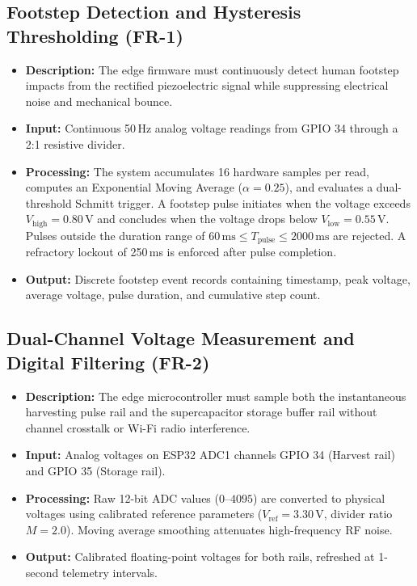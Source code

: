 \subsection{Footstep Detection and Hysteresis Thresholding (FR-1)}
\begin{itemize}
    \item \textbf{Description:} The edge firmware must continuously detect human footstep impacts from the rectified piezoelectric signal while suppressing electrical noise and mechanical bounce.
    \item \textbf{Input:} Continuous 50\,Hz analog voltage readings from GPIO 34 through a 2:1 resistive divider.
    \item \textbf{Processing:} The system accumulates 16 hardware samples per read, computes an Exponential Moving Average ($\alpha = 0.25$), and evaluates a dual-threshold Schmitt trigger. A footstep pulse initiates when the voltage exceeds $V_{\text{high}} = 0.80\,\text{V}$ and concludes when the voltage drops below $V_{\text{low}} = 0.55\,\text{V}$. Pulses outside the duration range of $60\,\text{ms} \le T_{\text{pulse}} \le 2000\,\text{ms}$ are rejected. A refractory lockout of 250\,ms is enforced after pulse completion.
    \item \textbf{Output:} Discrete footstep event records containing timestamp, peak voltage, average voltage, pulse duration, and cumulative step count.
\end{itemize}

\subsection{Dual-Channel Voltage Measurement and Digital Filtering (FR-2)}
\begin{itemize}
    \item \textbf{Description:} The edge microcontroller must sample both the instantaneous harvesting pulse rail and the supercapacitor storage buffer rail without channel crosstalk or Wi-Fi radio interference.
    \item \textbf{Input:} Analog voltages on ESP32 ADC1 channels GPIO 34 (Harvest rail) and GPIO 35 (Storage rail).
    \item \textbf{Processing:} Raw 12-bit ADC values ($0\text{--}4095$) are converted to physical voltages using calibrated reference parameters ($V_{\text{ref}} = 3.30\,\text{V}$, divider ratio $M = 2.0$). Moving average smoothing attenuates high-frequency RF noise.
    \item \textbf{Output:} Calibrated floating-point voltages for both rails, refreshed at 1-second telemetry intervals.
\end{itemize}

